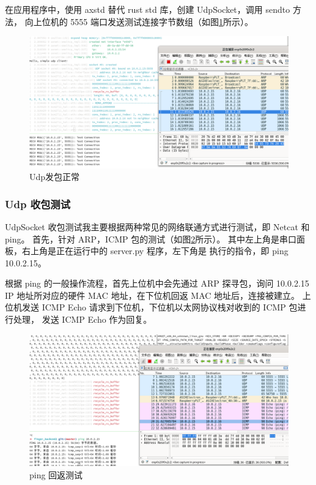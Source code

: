     在应用程序中，使用 axstd 替代 rust std 库，创建 UdpSocket，调用 sendto 方法，
    向上位机的 5555 端口发送测试连接字节数组（如图\ref{test::Udp发包}所示）。

    \begin{figure}[ht]
        \centering
        \includegraphics[width=\textwidth]{./imgs/测试-udp发包正常.png}
        \caption{Udp发包正常}    \label{test::Udp发包}
    \end{figure}   

    \subsubsection{Udp 收包测试}

    UdpSocket 收包测试我主要根据两种常见的网络联通方式进行测试，即 Netcat 和 ping。
    首先，针对 ARP，ICMP 包的测试（如图\ref{test::pingICMP回返测试}所示）。
    其中左上角是串口面板，右上角是正在运行中的 server.py 程序，左下角是
    执行的指令，即 ping 10.0.2.15。
    
    根据 ping 的一般操作流程，首先上位机中会先通过 ARP 探寻包，询问 10.0.2.15
    IP 地址所对应的硬件 MAC 地址，在下位机回返 MAC 地址后，连接被建立。
    上位机发送 ICMP Echo 请求到下位机，下位机以太网协议栈对收到的 ICMP 包进行处理，
    发送 ICMP Echo 作为回复。

    \begin{figure}[ht]
        \centering
        \includegraphics[width=\textwidth]{./imgs/测试-pingICMP回返测试.png}
        \caption{ping 回返测试}    \label{test::pingICMP回返测试}
    \end{figure}   

